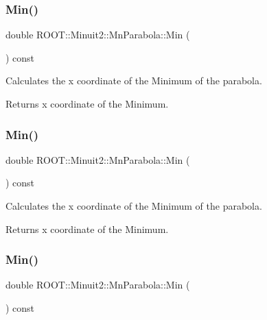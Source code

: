 \subsubsection{\texorpdfstring{Min()}{Min()}\hspace{0.1cm}{\footnotesize\ttfamily [1/3]}}
{\footnotesize\ttfamily double R\+O\+O\+T\+::\+Minuit2\+::\+Mn\+Parabola\+::\+Min (\begin{DoxyParamCaption}{ }\end{DoxyParamCaption}) const\hspace{0.3cm}{\ttfamily [inline]}}

Calculates the x coordinate of the Minimum of the parabola.

\begin{DoxyReturn}{Returns}
x coordinate of the Minimum. 
\end{DoxyReturn}
\mbox{\label{classROOT_1_1Minuit2_1_1MnParabola_ab3c7e51f6276d9ebf6d28fe965914bc8}} 
\subsubsection{\texorpdfstring{Min()}{Min()}\hspace{0.1cm}{\footnotesize\ttfamily [2/3]}}
{\footnotesize\ttfamily double R\+O\+O\+T\+::\+Minuit2\+::\+Mn\+Parabola\+::\+Min (\begin{DoxyParamCaption}{ }\end{DoxyParamCaption}) const\hspace{0.3cm}{\ttfamily [inline]}}

Calculates the x coordinate of the Minimum of the parabola.

\begin{DoxyReturn}{Returns}
x coordinate of the Minimum. 
\end{DoxyReturn}
\mbox{\label{classROOT_1_1Minuit2_1_1MnParabola_ab3c7e51f6276d9ebf6d28fe965914bc8}} 
\subsubsection{\texorpdfstring{Min()}{Min()}\hspace{0.1cm}{\footnotesize\ttfamily [3/3]}}
{\footnotesize\ttfamily double R\+O\+O\+T\+::\+Minuit2\+::\+Mn\+Parabola\+::\+Min (\begin{DoxyParamCaption}{ }\end{DoxyParamCaption}) const\hspace{0.3cm}{\ttfamily [inline]}}

